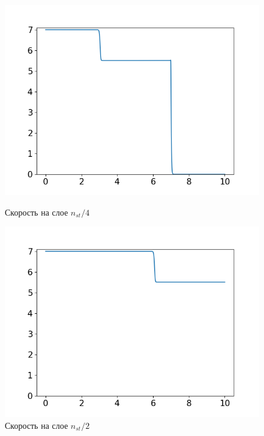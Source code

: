 \begin{figure}[h]
	\begin{minipage}[h]{0.47\linewidth}
		\centering
		\includegraphics[width=1\linewidth]{pics/task4/14u_1.png} 
		\caption{Скорость на слое $n_{st} / 4$}
	\end{minipage}
	\hfill
	\begin{minipage}[h]{0.47\linewidth}
		\centering
		\includegraphics[width=1\linewidth]{pics/task4/24u_1.png} 
		\caption{Скорость на слое $n_{st} / 2$}
	\end{minipage}
	\vfill
	\begin{minipage}[h]{0.47\linewidth}
		\centering

\end{minipage}
\end{figure}
